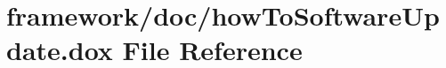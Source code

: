 \hypertarget{how_to_software_update_8dox}{}\section{framework/doc/how\+To\+Software\+Update.dox File Reference}
\label{how_to_software_update_8dox}
